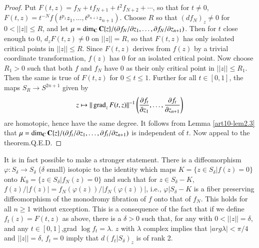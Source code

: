 \begin{proof}
Put $F (t, z) = f_N + t f_{N+1} +  t^2 f_{N+2} + \cdots$, so that for $t \neq 0$, $F(t,z) = t^{-N} f (t^{p_1} z_1, \ldots, t^{p_{n+1}} z_{n+1})$. Choose $R$ so that $(df_N)_z \neq 0$ for $0 < ||z|| \leqslant R$, and let $\mu = \dim_{\mathbf{C}} \mathbf{C} \{z\} / (\partial f_N / \partial z_1, \ldots, \partial f_N / \partial z_{n+1}) $. Then for $t$ close enough to $0$, $d_z F(t,z) \neq 0$ on $||z|| = R$, so that $F (t,z)$ has only isolated critical points in $||z|| \leqslant R$. Since $F(t,z)$ derives from $f(z)$ by a trivial coordinate transformation, $f(z)$ has 0 for an isolated critical point. Now choose $R_1 > 0$ such that both $f$ and $f_N$ have 0 as their only critical point in $||z|| \leqslant R_1$. Then the same is true of $F(t,z)$ for $0 \leqslant t \leq 1$. Further for all $t \in [0,1]$, the maps $S_R \to S^{2n+1}$ given by
$$
z \mapsto ||\operatorname{grad}_z F (t,z)||^{-1} \left(\dfrac{\partial f_t}{\partial z_1} , \ldots, \dfrac{\partial f_t}{\partial z_{n+1}} \right)
$$
are homotopic, hence have the same degree. It follows from Lemma \ref{art10-lem2.3} that $\mu = \dim_{\mathbf{C}} \mathbf{C} \{z\} / (\partial f_t / \partial z_1, \ldots, \partial f_t / \partial z_{n+1})$ is independent of $t$. Now appeal to the theorem.\hfill{Q.E.D.} 
\end{proof}

\begin{remark}\label{art10-rem2.5}
It is in fact possible to make a stronger statement. There is a diffeomorphism $\varphi: S_\delta \to S_\delta$ ($\delta$ small) isotopic to the identity which maps $K = \{z \in S_\delta | f(z) =0\}$ onto $K_0 = \{z \in S_\delta | f_N(z) =0\}$ and such that for $z \in S_\delta - K$, $f(z)/ | f(z)| = f_N (\varphi (z)) / | f_N (\varphi (z))|$, i.e., $\varphi | S_\delta - K$ is a fiber preserving diffeomorphism of the monodromy fibration of $f$ onto that of $f_N$. This holds for all $n \geqslant 1$ without exception. This is a consequence of the fact that if we define $f_t(z) = F (t,z)$ as above, there is a $\delta > 0$ such that, for any with $0 < ||z|| =\delta$, and any $t \in [0,1]$,grad $\log f_t = \lambda$. $z$  with $\lambda$ complex implies that $|arg \lambda |< \pi /4$ and $||z|| = \delta$, $f_t = 0$ imply that $d(f_t | S_\delta)_z$ is of rank 2.
\end{remark}

